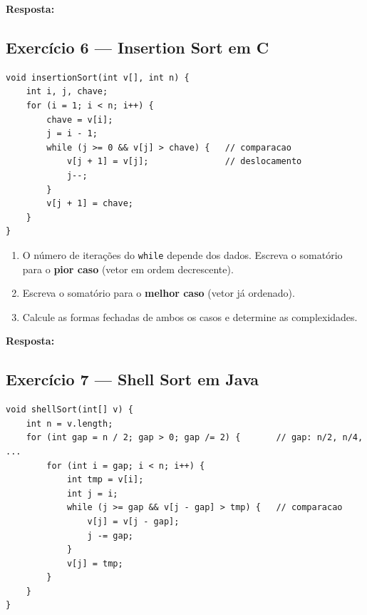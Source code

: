 \documentclass[12pt, a4paper]{article}
\newenvironment{resposta}{%
    \begin{mdframed}[linecolor=black!30, backgroundcolor=white,
                     innertopmargin=10pt, innerbottommargin=30pt,
                     skipabove=6pt]
    \textbf{Resposta:}\\[4pt]
}{%
    \end{mdframed}
}
\begin{document}
\begin{resposta}
\vspace{4cm}
\end{resposta}

\subsection*{Exercício 6 — Insertion Sort em C}

\begin{lstlisting}[style=cstyle]
void insertionSort(int v[], int n) {
    int i, j, chave;
    for (i = 1; i < n; i++) {
        chave = v[i];
        j = i - 1;
        while (j >= 0 && v[j] > chave) {   // comparacao
            v[j + 1] = v[j];               // deslocamento
            j--;
        }
        v[j + 1] = chave;
    }
}
\end{lstlisting}

\begin{enumerate}[label=(\alph*)]
    \item O número de iterações do \texttt{while} depende dos dados. Escreva o somatório para o \textbf{pior caso} (vetor em ordem decrescente).
    \item Escreva o somatório para o \textbf{melhor caso} (vetor já ordenado).
    \item Calcule as formas fechadas de ambos os casos e determine as complexidades.
\end{enumerate}

\begin{resposta}
\vspace{4cm}
\end{resposta}

\newpage
\subsection*{Exercício 7 — Shell Sort em Java}

\begin{lstlisting}[style=javastyle]
void shellSort(int[] v) {
    int n = v.length;
    for (int gap = n / 2; gap > 0; gap /= 2) {       // gap: n/2, n/4, ...
        for (int i = gap; i < n; i++) {
            int tmp = v[i];
            int j = i;
            while (j >= gap && v[j - gap] > tmp) {   // comparacao
                v[j] = v[j - gap];
                j -= gap;
            }
            v[j] = tmp;
        }
    }
}
\end{lstlisting}
\end{document}
